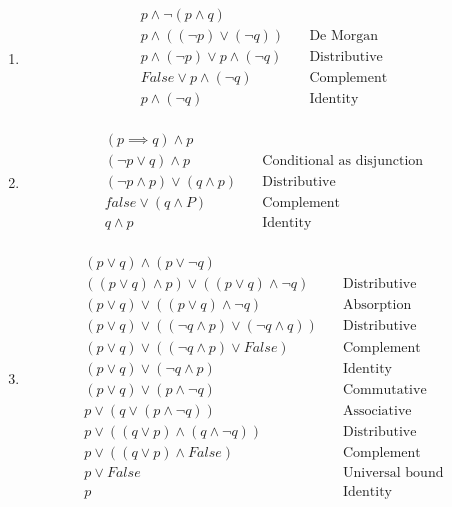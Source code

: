 \documentclass{article}
\begin{document}
\begin{enumerate}[label=\alph*)]

\item
\begin{align*}
  p \land \neg(p \land q)                &                      \\
  p \land ((\neg p) \lor (\neg q))       & \quad \text{De Morgan }   \\
  p \land (\neg p) \lor p \land (\neg q) & \quad \text{Distributive}  \\
  False \lor p \land (\neg q)            & \quad \text{Complement}    \\
  p \land (\neg q)                       & \quad \text{Identity} \\
\end{align*}

\item
\begin{align*}
(p \implies q) \land p             & \\
(\neg p \lor q) \land p            & \quad \text{Conditional as disjunction} \\
(\neg p \land p) \lor (q \land p)  & \quad \text{Distributive} \\
false \lor (q \land P)             & \quad \text{Complement} \\
q \land p                          & \quad \text{Identity} \\
\end{align*}

\item
\begin{align*}
(p \lor q) \land (p \lor \neg q)                          & \\
((p \lor q) \land p) \lor ((p \lor q) \land \neg q)       & \quad \text{Distributive} \\
(p \lor q) \lor ((p \lor q) \land \neg q)                 & \quad \text{Absorption} \\
(p \lor q) \lor ((\neg q \land p) \lor (\neg q \land q))  & \quad \text{Distributive} \\
(p \lor q) \lor ((\neg q \land p) \lor False)             & \quad \text{Complement} \\
(p \lor q) \lor (\neg q \land p)                          & \quad \text{Identity} \\
(p \lor q) \lor (p \land \neg q)                          & \quad \text{Commutative} \\
p \lor (q \lor (p \land \neg q))                          & \quad \text{Associative} \\
p \lor ((q \lor p) \land (q \land \neg q))                & \quad \text{Distributive} \\
p \lor ((q \lor p) \land False)                           & \quad \text{Complement} \\
p \lor False                                              & \quad \text{Universal bound} \\
p                                                         & \quad \text{Identity} \\
\end{align*}
                         

\end{enumerate}
\end{document}
